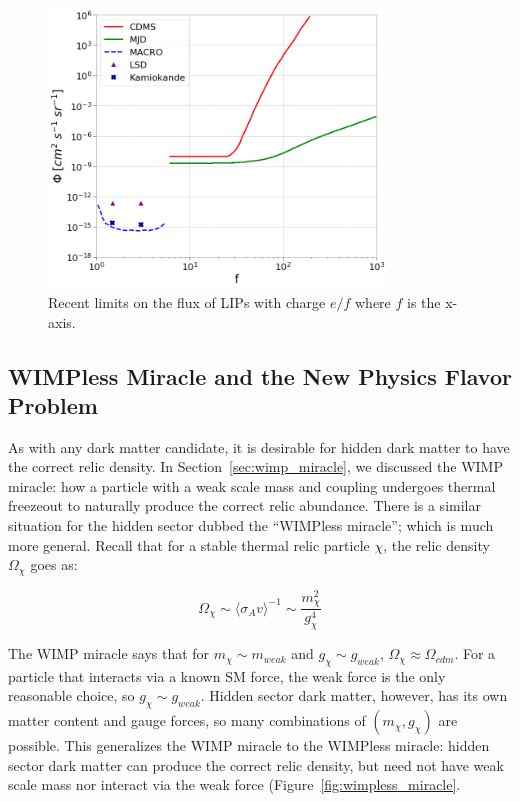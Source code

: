 \begin{figure}[htbp]
\begin{center}
\includegraphics[width=0.8\textwidth]{figures/theory/lip_limits.png}
\caption{Recent limits on the flux of \ac{LIP}s with charge $e/f$ where $f$ is the x-axis. }
\label{fig:lip_lims}
\end{center}
\end{figure}


\subsection{WIMPless Miracle and the New Physics Flavor Problem}
As with any dark matter candidate, it is desirable for hidden dark matter to have the correct relic density. In Section~\ref{sec:wimp_miracle}, we discussed the \ac{WIMP} miracle: how a particle with a weak scale mass and coupling undergoes thermal freezeout to naturally produce the correct relic abundance. There is a similar situation for the hidden sector dubbed the ``\ac{WIMP}less miracle''; which is much more general. Recall that for a stable thermal relic particle $\chi$, the relic density $\Omega_{\chi}$ goes as:

\begin{equation}
\Omega_{\chi} \sim \langle \sigma_{A}v \rangle^{-1} \sim \frac{m_{\chi}^{2}}{g_{\chi}^{4}}
\end{equation}

The \ac{WIMP} miracle says that for $m_{\chi} \sim m_{weak}$ and $g_{\chi} \sim g_{weak}$, $\Omega_{\chi} \approx \Omega_{cdm}$. For a particle that interacts via a known \ac{SM} force, the weak force is the only reasonable choice, so $g_{\chi} \sim g_{weak}$. Hidden sector dark matter, however, has its own matter content and gauge forces, so many combinations of $(m_{\chi}, g_{\chi})$ are possible. This generalizes the \ac{WIMP} miracle to the \ac{WIMP}less miracle: hidden sector dark matter can produce the correct relic density, but need not have weak scale mass nor interact via the weak force (Figure~\ref{fig:wimpless_miracle}.

